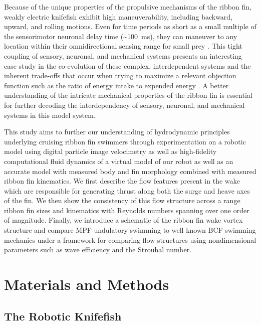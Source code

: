 \documentclass[onecolumn]{IEEEtran}
\begin{document}
Because of the unique properties of the propulsive mechanisms of the
ribbon fin, weakly electric knifefish exhibit high maneuverability, including backward, upward, and rolling motions. 
Even for time periods as short as a small multiple of the sensorimotor neuronal delay time (\textasciitilde 100~ms),
they can maneuver to any location within their omnidirectional sensing range for small
prey \citep*{Snyd07a}. This tight coupling of sensory, neuronal, and
mechanical systems presents an interesting case study in the co-evolution
of these complex, interdependent systems and the inherent trade-offs that
occur when trying to maximize a relevant objection function such as the 
ratio of energy intake to expended energy \citep*{MacI10a}. A
better understanding of the intricate mechanical properties of the ribbon
fin is essential for further decoding the interdependency of sensory, neuronal,
and mechanical systems in this model system.

This study aims to further our understanding of hydrodynamic principles
underlying cruising ribbon fin swimmers through experimentation on a robotic model using 
digital particle image velocimetry as well as high-fidelity computational 
fluid dynamics of a virtual model of our robot as well as an accurate model with measured body and fin 
morphology combined with measured ribbon fin kinematics. We first
describe the flow features present in the wake which are responsible for
generating thrust along both the surge and heave axes of the fin. We then
show the consistency of this flow structure across a range ribbon fin 
sizes and kinematics with Reynolds numbers spanning over one order of magnitude. Finally,
we introduce a schematic of the ribbon fin wake vortex structure and
compare MPF undulatory swimming to well known BCF swimming mechanics under
a framework for comparing flow structures using nondimensional parameters
such as wave efficiency and the Strouhal number.

\section{Materials and Methods}
\subsection{The Robotic Knifefish}
\end{document}
